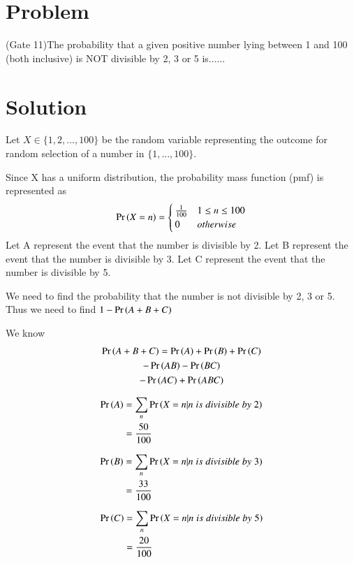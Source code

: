 \documentclass[journal,12pt,twocolumn]{IEEEtran}
\begin{document}
\section{Problem}
(Gate 11)The probability that a given positive number lying between 1 and 100 (both inclusive) is NOT divisible by 2, 3 or 5 is...... 
\section{Solution}
Let $X \in  \{1,2,...,100\}$ be the random variable representing the outcome for random selection of a number in $\{1,...,100\}$.

Since X has a uniform distribution, the probability mass function (pmf) is represented as 
\begin{align}
    \Pr\left(X  = n\right) = 
    \begin{cases}
        \frac{1}{100} & 1  \le n \le 100 \\
        0 & otherwise
    \end{cases}
\end{align}
Let A represent the event that the number is divisible by 2.
Let B represent the event that the number is divisible by 3.
Let C represent the event that the number is divisible by 5.

We need to find the probability that the number is not divisible by 2, 3 or 5. Thus we need to find $1 - \Pr\left(A+B+C\right)$

We know 
\begin{multline}
    \Pr\left(A+B+C\right) = \Pr\left(A\right) + \Pr\left(B\right) + \Pr\left(C\right) \\- \Pr\left(AB\right) - \Pr\left(BC\right) \\- \Pr\left(AC\right) + \Pr\left(ABC\right)\label{Shurururururururu}    
\end{multline}

\begin{align}
    \Pr\left(A\right) &= \sum_n\Pr\left(X = n|n\; is\; divisible\; by\; 2\right)\\
           &= \frac{50}{100}   
\end{align}

\begin{align}
    \Pr\left(B\right) &= \sum_n\Pr\left(X = n|n\; is\; divisible\; by\; 3\right)\\
           &= \frac{33}{100}   
\end{align}

\begin{align}
    \Pr\left(C\right) &= \sum_n\Pr\left(X = n|n\; is\; divisible\; by\; 5\right)\\
           &= \frac{20}{100}   
\end{align}
\end{document}
